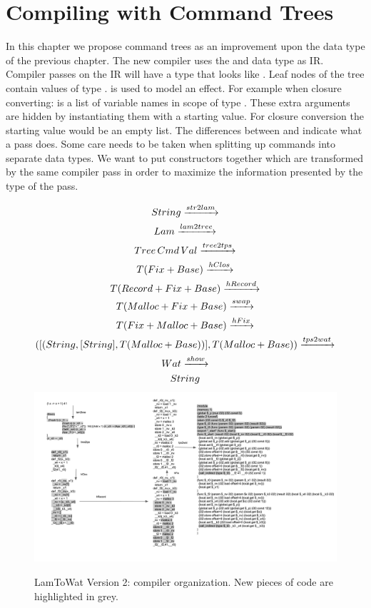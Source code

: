 
\chapter{\label{chap:treecomp}Compiling with Command Trees}

In this chapter we propose command trees as an improvement upon the  data type of the previous chapter. The new compiler uses the  and  data type as IR. Compiler passes on the IR will have a type that looks like . Leaf nodes of the tree contain values of type .  is used to model an effect. For example when closure converting:  is a list of variable names in scope of type \icode{[String]}. These extra arguments are hidden by instantiating them with a starting value. For closure conversion the starting value would be an empty list. The differences between  and  indicate what a pass does. Some care needs to be taken when splitting up commands into separate data types. We want to put constructors together which are transformed by the same compiler pass in order to maximize the information presented by the type of the pass.

\begin{figure}
\begin{gather*}
  String \xrightarrow{str2lam}\\
  Lam \xrightarrow{lam2tree}\\
  Tree \, Cmd \, Val \xrightarrow{tree2tps}\\
  T (Fix + Base) \xrightarrow{hClos}\\
  T (Record + Fix + Base) \xrightarrow{hRecord}\\
  T (Malloc + Fix + Base) \xrightarrow{swap}\\
  T (Fix + Malloc + Base) \xrightarrow{hFix}\\
  ([(String,[String],T (Malloc + Base))], T (Malloc + Base)) \xrightarrow{tps2wat}\\
  Wat \xrightarrow{show}\\
  String
\end{gather*}
\includegraphics[width=1\textwidth]{./img/tps.png}
\caption{LamToWat Version 2: compiler organization. New pieces of code are highlighted in grey.}
\label{fig:lam2watv2org}
\end{figure}

